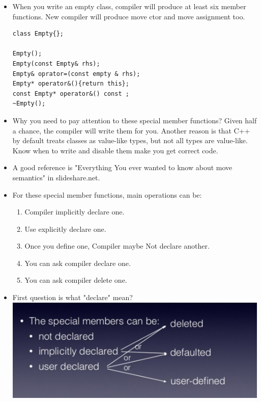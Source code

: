 \documentclass[a4paper,11pt,twoside]{book}
\begin{document}
\begin{itemize}

\item When you write an empty class, compiler will produce at least six member functions.  New compiler will produce move ctor and move assignment too.
\begin{lstlisting}[numbers=none]
class Empty{};

Empty();
Empty(const Empty& rhs);
Empty& oprator=(const empty & rhs);
Empty* operator&(){return this};
const Empty* operator&() const ;
~Empty();
\end{lstlisting}

\item Why you need to pay attention to these special member functions?  Given half a chance, the compiler will write them for you. Another reason is that C++ by default treats classes as value-like types, but not all types are value-like. Know when to write and disable them make you get correct code.

\item A good reference is "Everything You ever wanted to know about move semantics" in slideshare.net.

\item For these special member functions, main operations can be:
\begin{enumerate}
\item Compiler implicitly declare one.
\item Use explicitly declare one.
\item Once you define one, Compiler maybe Not declare another.
\item You can ask compiler declare one.
\item You can ask compiler delete one.
\end{enumerate}

\item First question is what "declare" mean?  \\
\includegraphics[scale=0.6]{pics/sm1.png} \newline


\end{itemize}
\end{document}
